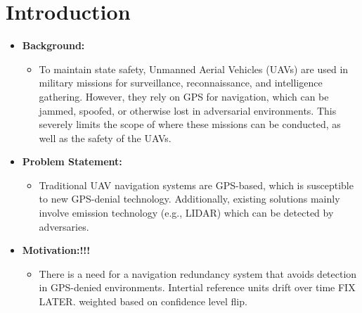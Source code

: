 \section{Introduction}
\begin{itemize}
    \item \textbf{Background:}
    \begin{itemize}
        \item To maintain state safety, Unmanned Aerial Vehicles (UAVs) are used in military missions for surveillance, reconnaissance, and intelligence gathering. However, they rely on GPS for navigation, which can be jammed, spoofed, or otherwise lost in adversarial environments. This severely limits the scope of where these missions can be conducted, as well as the safety of the UAVs.
    \end{itemize}
    \item \textbf{Problem Statement:}
    \begin{itemize}
        \item Traditional UAV navigation systems are GPS-based, which is susceptible to new GPS-denial technology. Additionally, existing solutions mainly involve emission technology (e.g., LIDAR) which can be detected by adversaries.
    \end{itemize}
    \item \textbf{Motivation:!!!}
    \begin{itemize}
        \item There is a need for a navigation redundancy system that avoids detection in GPS-denied environments. Intertial reference units drift over time FIX LATER. weighted based on confidence level flip. 
    \end{itemize}
\end{itemize}

